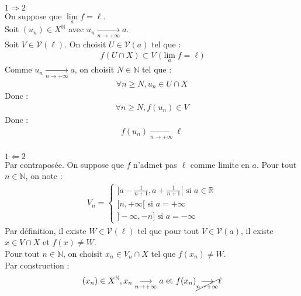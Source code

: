 \documentclass[../main.tex]{subfiles}
\begin{document}
$\boxed{1 \Rightarrow 2}$ \\
On suppose que $\lim\limits_a f = \ell$. \\
Soit $(u_n) \in X^{\mathbb{N}}$ avec $u_n \underset{n \to +\infty}{\longrightarrow} a$. \\
Soit $V \in \mathcal{V}(\ell)$. On choisit $U \in \mathcal{V}(a)$ tel que : 
\begin{align*}
    f(U \cap X) \subset V \text{ ($\lim\limits_a f = \ell$)}
\end{align*}
Comme $u_n \underset{n \to +\infty}{\longrightarrow} a$, on choisit $N \in \mathbb{N}$ tel que : 
\begin{align*}
    \forall n \geq N, u_n \in U \cap X
\end{align*}
Donc : 
\begin{align*}
    \forall n \geq N, f(u_n) \in V
\end{align*}
Donc : 
\begin{align*}
    f(u_n) \underset{n \to +\infty}{\longrightarrow} \ell
\end{align*} \\

$\boxed{1 \Leftarrow 2}$ \\
Par contraposée. On suppose que $f$ n'admet pas $\ell$ comme limite en $a$. Pour tout $n \in \mathbb{N}$, on note : 
\begin{align*}
    V_n = \begin{cases}
        ]a - \frac{1}{n+1}, a + \frac{1}{n+1}[ \text{ si $a \in \mathbb{R}$} \\
        [n, +\infty[ \text{ si $a = +\infty$} \\
        ]-\infty, -n] \text{ si $a = -\infty$}
    \end{cases}
\end{align*}
Par définition, il existe $W \in \mathcal{V}(\ell)$ tel que pour tout $V \in \mathcal{V}(a)$, il existe $x \in V \cap X$ et $f(x) \neq W$. \\
Pour tout $n \in \mathbb{N}$, on choisit $x_n \in V_n \cap X$ tel que $f(x_n) \neq W$. \\
Par construction : 
\begin{align*}
    (x_n) \in X^\mathbb{N}, x_n \underset{n \to +\infty}{\longrightarrow} a \text{ et } f(x_n) \cancel{\underset{n \to +\infty}{\longrightarrow}} \ell
\end{align*}

\setcounter{section}{38}
\end{document}
